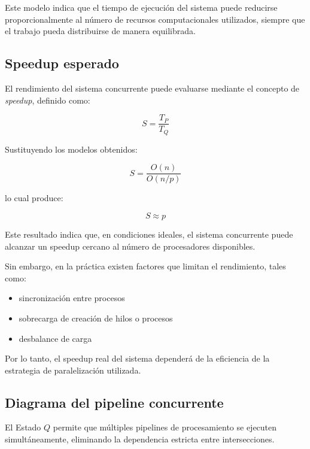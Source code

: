 \documentclass[12pt]{article}
\begin{document}
Este modelo indica que el tiempo de ejecución del sistema puede reducirse proporcionalmente al número de recursos computacionales utilizados, siempre que el trabajo pueda distribuirse de manera equilibrada.

\subsection{Speedup esperado}

El rendimiento del sistema concurrente puede evaluarse mediante el concepto de \textit{speedup}, definido como:

\[
S = \frac{T_P}{T_Q}
\]

Sustituyendo los modelos obtenidos:

\[
S = \frac{O(n)}{O(n/p)}
\]

lo cual produce:

\[
S \approx p
\]

Este resultado indica que, en condiciones ideales, el sistema concurrente puede alcanzar un speedup cercano al número de procesadores disponibles.

Sin embargo, en la práctica existen factores que limitan el rendimiento, tales como:

\begin{itemize}
\item sincronización entre procesos
\item sobrecarga de creación de hilos o procesos
\item desbalance de carga
\end{itemize}

Por lo tanto, el speedup real del sistema dependerá de la eficiencia de la estrategia de paralelización utilizada.

\subsection{Diagrama del pipeline concurrente}

El Estado \(Q\) permite que múltiples pipelines de procesamiento se ejecuten simultáneamente, eliminando la dependencia estricta entre intersecciones.
\end{document}
